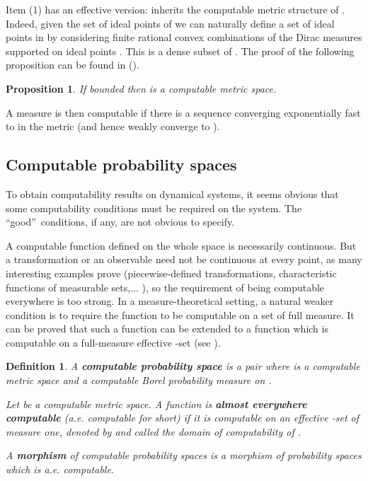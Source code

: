 \documentclass[copyright,creativecommons]{eptcs}
\newtheorem{definition}{Definition}
\newtheorem{proposition}{Proposition}
\numberwithin{equation}{section}
\begin{document}
Item (1) has an effective version:  inherits the computable metric
structure of . Indeed, given the set  of ideal points of  we
can naturally define a set of ideal points  in  by
considering finite rational convex combinations of the Dirac measures  supported on ideal points . This is a dense subset
of . The proof of the following proposition can be found in (\cite {HR07}).

\begin{proposition}
If  bounded then  is a computable metric space.
\end{proposition}

A measure  is then computable if there is a sequence  converging exponentially fast to  in the  metric (and
hence  weakly converge to ).

\subsection{Computable probability spaces}

To obtain computability results on dynamical systems, it seems obvious that
some computability conditions must be required on the system. The
\textquotedblleft good\textquotedblright\ conditions, if any, are not
obvious to specify.

A computable function defined on the whole space is necessarily continuous.
But a transformation or an observable need not be continuous at every point,
as many interesting examples prove (piecewise-defined transformations,
characteristic functions of measurable sets,... ), so the requirement of
being computable everywhere is too strong. In a measure-theoretical setting,
a natural weaker condition is to require the function to be computable on a
set of full measure. It can be proved that such a function can be extended
to a function which is computable on a full-measure effective -set (see \cite{HR07, Hoy08}).

\begin{definition}
\label{a.e.compufunct}A \textbf{\emph{computable probability space}} is a
pair  where  is a computable metric space and  a
computable Borel probability measure on .

Let  be a computable metric space. A function  is
\textbf{\emph{almost everywhere computable}} (a.e. computable for short) if
it is computable on an effective -set of measure one, denoted
by  and called the \emph{domain of computability of }.

A \textbf{\emph{morphism}} of computable probability spaces  is a morphism of probability spaces which is a.e.
computable.
\end{definition}
\end{document}
